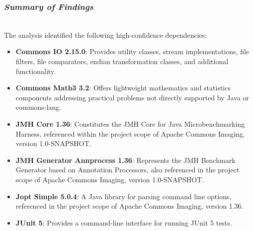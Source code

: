 \documentclass[sigconf]{acmart}
\begin{document}
\begin{table}[h!]
\centering
{}
\caption{OWASP dependencies checker report summary}
\label{tab:OWASP}
\end{table}



\subsubsection{\textit{\textbf{Summary  of Findings}}}
\hfill\\

The analysis identified the following high-confidence dependencies:

\begin{itemize}
    \item \textbf{Commons IO 2.15.0}: Provides utility classes, stream implementations, file filters, file comparators, endian transformation classes, and additional functionality. 
    
    \item \textbf{Commons Math3 3.2}: Offers lightweight mathematics and statistics components addressing practical problems not directly supported by Java or commons-lang.
    
    \item \textbf{JMH Core 1.36}: Constitutes the JMH Core for Java Microbenchmarking Harness, referenced within the project scope of Apache Commons Imaging, version 1.0-SNAPSHOT.
    
    \item \textbf{JMH Generator Annprocess 1.36}: Represents the JMH Benchmark Generator based on Annotation Processors, also referenced in the project scope of Apache Commons Imaging, version 1.0-SNAPSHOT.
    
    \item \textbf{Jopt Simple 5.0.4}: A Java library for parsing command line options, referenced in the project scope of Apache Commons Imaging, version 1.36.

    \item \textbf{JUnit 5}: Provides a command-line interface for running JUnit 5 tests.
    
\end{itemize}
\end{document}
